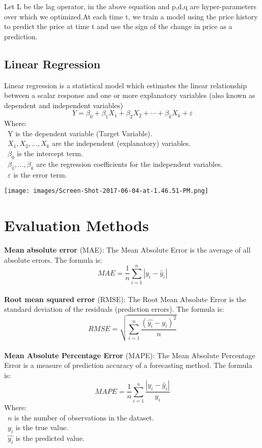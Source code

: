\documentclass{ieeeojies}
\begin{document}
Let L be the lag operator, in the above equation and p,d,q are hyper-parameters over which we optimized.At each time t, we train a model using the price history to predict the price at time t and use the sign of the change in price as a prediction.
\subsection{Linear Regression}
 Linear regression is a statistical model which estimates the linear relationship between a scalar response and one or more explanatory variables (also known as dependent and independent variables)
 \[Y=\beta_0+\beta_1X_1+\beta_2X_2+\cdots+\beta_kX_k+\varepsilon\]
Where:\\
	\indent\textbullet\ Y is the dependent variable (Target Variable).\\
	\indent\textbullet\ \(X_1, X_2, \ldots, X_k\) are the independent (explanatory) variables.\\
	\indent\textbullet\ \(\beta_0\) is the intercept term.\\
	\indent\textbullet\ \(\beta_1,..., \beta_k\) are the regression coefficients for the independent variables.\\
	\indent\textbullet\ \(\varepsilon\) is the error term.

 \texttt{[image: images/Screen-Shot-2017-06-04-at-1.46.51-PM.png]}
\section{Evaluation Methods}
\textbf{Mean absolute error} (MAE): 
The Mean Absolute Error is the average of all absolute errors. The formula is:\\
\[MAE = \frac{1}{n} \sum_{i=1}^{n} | y_i - \hat{y}_i |\]\\
  
\textbf{Root mean squared error} (RMSE): The Root Mean Absolute Error is the standard deviation of the residuals (prediction errors). The formula is: \\
\[RMSE=\sqrt{\sum_{i=1}^{n} \frac{(\hat{y_i}-y_i )^2}{n} }\]\\
\textbf{Mean Absolute Percentage Error} (MAPE): The Mean Absolute Percentage Error is a measure of prediction accuracy of a forecasting method. The formula is:  \\
\[MAPE=\frac{1}{n}\sum_{i=1}^{n} \frac{|y_i-\hat{y}_i|}{y_i}\]
Where: \\
	\indent\textbullet\ \(n\) is the number of observations in the dataset.\\
	\indent\textbullet\ \(y_i\)  is the true value.\\
	\indent\textbullet\ \(\hat{y_i}\) is the predicted value.
\end{document}
